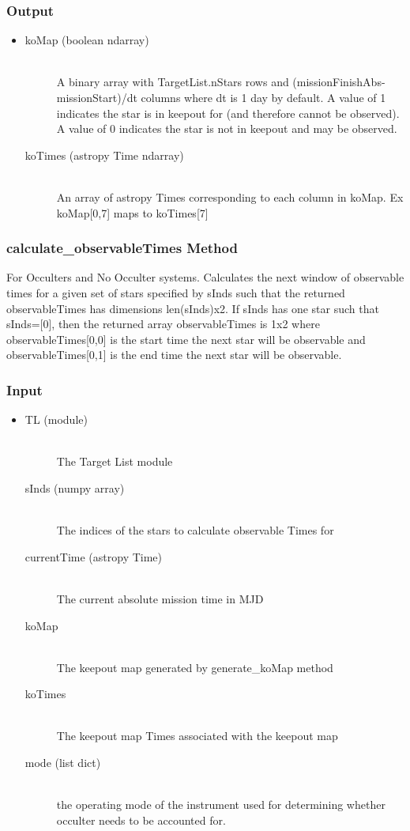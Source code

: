 \documentclass[cleanfoot]{asme2ej}
\begin{document}
\subsubsection*{Output}
\begin{itemize}
\item 
\begin{description}
    \item[koMap (boolean ndarray)] \hfill \\ A binary array with TargetList.nStars rows and (missionFinishAbs-missionStart)/dt columns where dt is 1 day by default. A value of 1 indicates the star is in keepout for (and therefore cannot be observed). A value of 0 indicates the star is not in keepout and may be observed.
    \item[koTimes (astropy Time ndarray)] \hfill \\ An array of astropy Times corresponding to each column in koMap. Ex koMap[0,7] maps to koTimes[7] 
\end{description}
\end{itemize}

\subsubsection{calculate\_observableTimes Method}
For Occulters and No Occulter systems. Calculates the next window of observable times for a given set of stars specified by sInds such that the returned observableTimes has dimensions len(sInds)x2. If sInds has one star such that sInds=[0], then the returned array observableTimes is 1x2 where observableTimes[0,0] is the start time the next star will be observable and observableTimes[0,1] is the end time the next star will be observable.
\subsubsection*{Input}
\begin{itemize}
\item 
\begin{description}
    \item[TL (module)] \hfill \\ The Target List module
    \item[sInds (numpy array)] \hfill \\ The indices of the stars to calculate observable Times for
    \item[currentTime (astropy Time)] \hfill \\ The current absolute mission time in MJD
    \item[koMap] \hfill \\ The keepout map generated by generate\_koMap method
    \item[koTimes] \hfill \\ The keepout map Times associated with the keepout map
    \item[mode (list dict)] \hfill \\ the operating mode of the instrument used for determining whether occulter needs to be accounted for.
\end{description}
\end{itemize}
\end{document}

